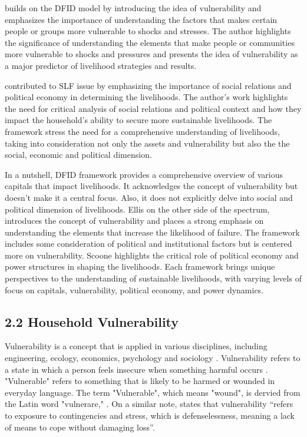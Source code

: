 \documentclass[12pt, a4paper]{article}
\begin{document}
\cite{ellis1999rural}  builds on the DFID model by introducing the idea of vulnerability and emphasizes the importance of understanding the factors that makes certain people or groups more vulnerable to shocks and stresses. The author highlights the significance of understanding the elements that make people or communities more vulnerable to shocks and pressures and presents the idea of vulnerability as a major predictor of livelihood strategies and results.

\cite{scoones2013livelihoods} contributed to SLF issue by emphasizing the importance of social relations and political economy in determining the livelihoods. The author's work highlights the need for critical analysis of social relations and political context and how they impact the household's ability to secure more sustainable livelihoods. The framework stress the need for a comprehensive understanding of livelihoods, taking into consideration not only the assets and vulnerability but also the the social, economic and political dimension. 

In a nutshell, DFID framework provides a comprehensive overview of various capitals that impact livelihoods. It acknowledges the concept of vulnerability but doesn't make it a central focus. Also, it does not explicitly delve into social and political dimension of livelihoods. Ellis on the other side of the spectrum, introduces the concept of vulnerability and places a strong emphasis on understanding the elements that increase the likelihood of failure. The framework includes some consideration of political and institutional factors but is centered more on vulnerability. Scoone highlights the critical role of political economy and power structures in shaping the livelihoods. Each framework brings unique perspectives to the understanding of sustainable livelihoods, with varying levels of focus on capitals, vulnerability, political economy, and power dynamics.    
         
\subsection*{2.2 Household Vulnerability}
\renewcommand{\thepage}{\arabic{page}}
Vulnerability is a concept that is applied in various disciplines, including engineering, ecology, economics, psychology and sociology \citep{fang2016rural}. Vulnerability refers to a state in which a person feels insecure when something harmful occurs \citep{chambers2006vulnerability}. "Vulnerable" refers to something that is likely to be harmed or wounded in everyday language. The term "Vulnerable", which means "wound", is dervied from the Latin word "vulnerare," \citep{calvo2005measuring}. On a similar note, \cite{chambers1989editorial}  states that vulnerability “refers to exposure to contingencies and stress, which is defenselessness, meaning a lack of means to cope without damaging loss”. 
\end{document}
